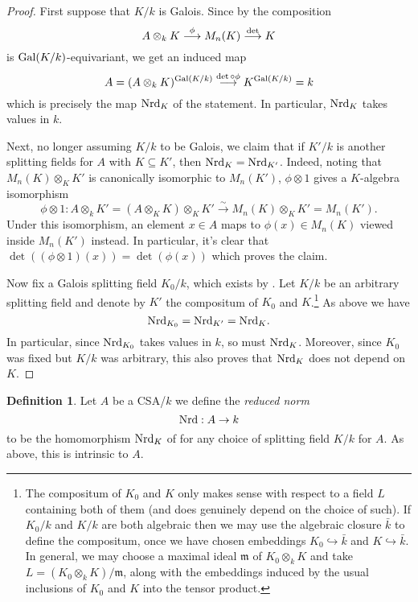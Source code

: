 \documentclass[11pt]{amsart}
\numberwithin{equation}{section}
\theoremstyle{remark}
\theoremstyle{remark}
\theoremstyle{remark}
\theoremstyle{definition}
\theoremstyle{definition}
\theoremstyle{definition}
\newtheorem{defi}[equation]{Definition}
\theoremstyle{definition}
\theoremstyle{definition}
\theoremstyle{definition}
\begin{document}
\begin{proof}
First suppose that $K/k$ is Galois. Since by  the composition \[A\otimes_kK \stackrel{\phi}{\longrightarrow} M_n(K)\stackrel{\textup{det}}{\longrightarrow}K\]  is $\textup{Gal}(K/k)$-equivariant, we get an induced map
\[A=(A\otimes_k K)^{\textup{Gal}(K/k)}\stackrel{\det \circ \phi}{\longrightarrow}K^{\textup{Gal}(K/k)}=k\]
which is precisely the map $\textup{Nrd}_K$ of the statement. In particular, $\textup{Nrd}_K$ takes values in $k$. 

Next, no longer assuming $K/k$ to be Galois, we claim that if $K'/k$ is another splitting fields for $A$ with $K\subseteq K'$, then $\textup{Nrd}_K=\textup{Nrd}_{K'}$. Indeed, noting that $M_n(K)\otimes_K K'$ is canonically isomorphic to $M_n(K')$, $\phi\otimes 1$ gives a $K$-algebra isomorphism
\[\phi\otimes 1: A\otimes_k K'=(A\otimes_K K)\otimes_K K' \stackrel{\sim}{\longrightarrow} M_n(K)\otimes_K K'=M_n(K').\]
Under this isomorphism, an element $x\in A$ maps to $\phi(x)\in M_n(K)$ viewed inside $M_n(K')$ instead. In particular, it's clear that $\det\left((\phi\otimes 1)(x)\right)=\det(\phi(x))$ which proves the claim. 

Now fix a Galois splitting field $K_0/k$, which exists by .  Let $K/k$ be an arbitrary splitting field and denote by $K'$ the compositum of $K_0$ and $K$.\footnote{The compositum of $K_0$ and $K$ only makes sense with respect to a field $L$ containing both of them (and does genuinely depend on the choice of such). If $K_0/k$ and $K/k$ are both algebraic then we may use the algebraic closure $\bar{k}$ to define the compositum, once we have chosen embeddings $K_0\hookrightarrow \bar{k}$ and $K\hookrightarrow \bar{k}$. In general, we may choose a maximal ideal $\mathfrak{m}$ of $K_0\otimes_k K$ and take $L=(K_0\otimes_kK)/\mathfrak{m}$, along with the embeddings induced by the usual inclusions of $K_0$ and $K$ into the tensor product.} As above we have
\[\textup{Nrd}_{K_0}=\textup{Nrd}_{K'}=\textup{Nrd}_{K}.\]
In particular, since $\textup{Nrd}_{K_0}$ takes values in $k$, so must $\textup{Nrd}_{K}$. Moreover, since $K_0$ was fixed but $K/k$ was arbitrary, this also proves that $\textup{Nrd}_{K}$ does not depend on $K$.
\end{proof}

\begin{defi}
Let $A$ be a CSA/$k$ we define the \emph{reduced norm}
\[\textup{Nrd}:A\rightarrow k\]
to be the homomorphism $\textup{Nrd}_K$ of   for any choice of splitting field $K/k$ for $A$. As above, this is intrinsic to $A$.
\end{defi}
\end{document}
